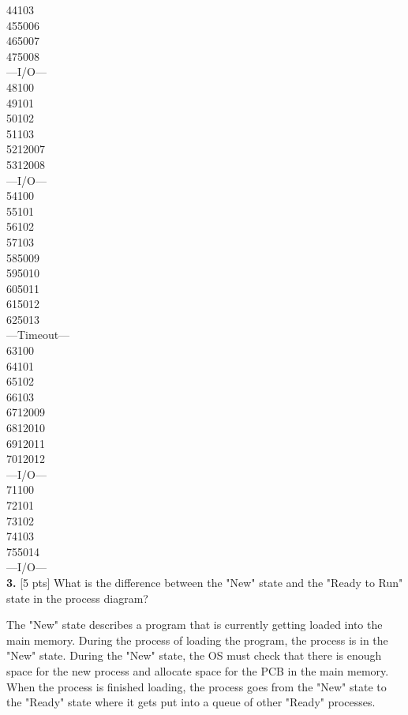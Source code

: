 \documentclass[12pt]{article}
\newcommand\tab[1][1cm]{\hspace*{#1}}
\begin{document}
44\tab 103\\
45\tab 5006\\
46\tab 5007\\
47\tab 5008\\
---I/O---\\
48\tab 100\\
49\tab 101\\
50\tab 102\\
51\tab 103\\
52\tab 12007\\
53\tab 12008\\
---I/O---\\
54\tab 100\\
55\tab 101\\
56\tab 102\\
57\tab 103\\
58\tab 5009\\
59\tab 5010\\
60\tab 5011\\
61\tab 5012\\
62\tab 5013\\
---Timeout---\\
63\tab 100\\
64\tab 101\\
65\tab 102\\
66\tab 103\\
67\tab 12009\\
68\tab 12010\\
69\tab 12011\\
70\tab 12012\\
---I/O---\\
71\tab 100\\
72\tab 101\\
73\tab 102\\
74\tab 103\\
75\tab 5014\\
---I/O---\\

{\bf 3.} [5 pts] What is the difference between the "New" state and the "Ready to Run" state in the process diagram?

The "New" state describes a program that is currently getting loaded into the main memory. During the process of loading the program, the process is in the "New" state. During the "New" state, the OS must check that there is enough space for the new process and allocate space for the PCB in the main memory. When the process is finished loading, the process goes from the "New" state to the "Ready" state where it gets put into a queue of other "Ready" processes. 
\end{document}
